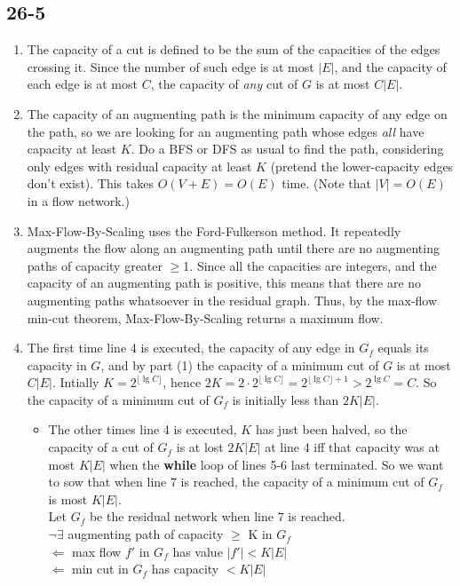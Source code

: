 \documentclass{article}[12pt]
\begin{document}
\subsection*{26-5}
\begin{enumerate}
	\item The capacity of a cut is defined to be the sum of the capacities of the edges crossing it. Since the number of such edge is at most $|E|$, and the capacity of each edge is at most $C$, the capacity of \emph{any} cut of $G$ is at most $C|E|$. 
	\item The capacity of an augmenting path is the minimum capacity of any edge on the path, so we are looking for an augmenting path whose edges \emph{all} have capacity at least $K$. Do a BFS or DFS as usual to find the path, considering only edges with residual capacity at least $K$ (pretend the lower-capacity edges don't exist). This takes $O(V+E)=O(E)$ time. (Note that $|V|=O(E)$ in a flow network.)
	\item Max-Flow-By-Scaling uses the Ford-Fulkerson method. It repeatedly augments the flow along an augmenting path until there are no augmenting paths of capacity greater $\geq$1. Since all the capacities are integers, and the capacity of an augmenting path is positive, this means that there are no augmenting paths whatsoever in the residual graph. Thus, by the max-flow min-cut theorem, Max-Flow-By-Scaling returns a maximum flow. 
	\item The first time line 4 is executed, the capacity of any edge in $G_f$ equals its capacity in $G$, and by part (1) the capacity of a minimum cut of $G$ is at most $C|E|$. Intially $K=2^{\lfloor\lg C\rfloor}$, hence $2K = 2\cdot 2^{\lfloor\lg C\rfloor}=2^{\lfloor\lg C\rfloor+1}>2^{\lg C}=C$. So the capacity of a minimum cut of $G_f$ is initially less than $2K|E|$. \\
	
\begin{itemize}
	\item The other times line 4 is executed, $K$ has just been halved, so the capacity of a cut of $G_f$ is at lost $2K|E|$ at line 4 iff that capacity was at most $K|E|$ when the \textbf{while} loop of lines 5-6 last terminated. So we want to sow that when line 7 is reached, the capacity of a minimum cut of $G_f$ is most $K|E|$. \\
	Let $G_f$ be the residual network when line 7 is reached. \\
	$\neg \exists$ augmenting path of capacity $\geq$ K in $G_f$\\
	$\Leftarrow$ max flow $f'$ in $G_f$ has value $|f'|<K|E|$\\
	$\Leftarrow$ min cut in $G_f$ has capacity $<K|E|$
\end{itemize}


\end{enumerate}
\end{document}
